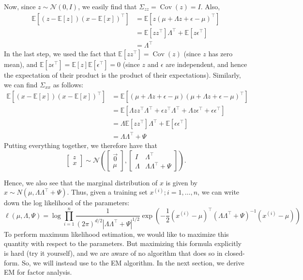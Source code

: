Now, since $z \sim \mathcal N (0, I)$, we easily find that $\Sigma_{zz} = \operatorname{Cov}(z) = I$. Also,
\begin{align*}
    \mathbb E[(z - \mathbb E[z])(x - \mathbb E[x])^\top] &= \mathbb E[z(\mu + \Lambda z + \epsilon - \mu)^\top]\\
        &= \mathbb E[zz^\top]\Lambda^\top + \mathbb E[z\epsilon^\top]\\
        &= \Lambda^\top
\end{align*}
In the last step, we used the fact that $\mathbb E[zz^\top] = \operatorname{Cov}(z)$ (since $z$ has zero
mean), and $\mathbb E[z\epsilon^\top] = \mathbb E[z]\mathbb E[\epsilon^\top] = 0$ (since $z$ and $\epsilon$ are independent, and
hence the expectation of their product is the product of their expectations).
Similarly, we can find $\Sigma_{xx}$ as follows:
\begin{align*}
    \mathbb E[(x - \mathbb E[x])(x - \mathbb E[x])^\top] &= \mathbb E[(\mu + \Lambda z + \epsilon - \mu )(\mu + \Lambda z + \epsilon - \mu)^\top]\\
        &= \mathbb E[\Lambda zz^\top\Lambda^\top + \epsilon z^\top\Lambda^\top + \Lambda z\epsilon^\top + \epsilon \epsilon^\top]\\
        &= \Lambda \mathbb E[zz^\top]\Lambda^\top + \mathbb E[\epsilon \epsilon^\top]\\
        &= \Lambda \Lambda^\top + \Psi
\end{align*}
Putting everything together, we therefore have that
\begin{equation}\label{eq:joint_gaussian}
    \begin{bmatrix}
        z\\
        x
    \end{bmatrix} \sim \mathcal N\left(\begin{bmatrix}
        \vec{0}\\
        \mu
    \end{bmatrix}, \begin{bmatrix}
        I & \Lambda^\top\\
        \Lambda & \Lambda\Lambda^\top + \Psi
    \end{bmatrix} \right).
\end{equation}

Hence, we also see that the marginal distribution of $x$ is given by $x \sim 
N (\mu ,\Lambda \Lambda^\top + \Psi)$. Thus, given a training set ${x^{(i)}
; i = 1, \ldots, n}$, we can write
down the log likelihood of the parameters:
\begin{equation}
    \ell(\mu ,\Lambda , \Psi) = \log \prod^n_{i=1} \frac{1}{(2\pi)^{d/2}|\Lambda \Lambda^\top + \Psi|^{1/2}}\exp\left(-\frac{1}{2} (x^{(i)} - \mu)^\top (\Lambda \Lambda^\top + \Psi)^{-1} (x^{(i)} - \mu)\right)
\end{equation}
To perform maximum likelihood estimation, we would like to maximize this
quantity with respect to the parameters. But maximizing this formula explicitly is hard (try it yourself), and we are aware of no algorithm that does
so in closed-form. So, we will instead use to the EM algorithm. In the next
section, we derive EM for factor analysis.


